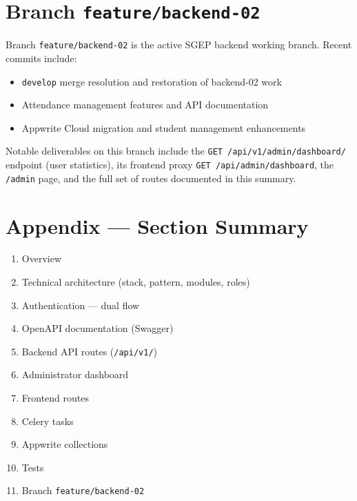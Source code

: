 \documentclass[11pt,a4paper]{article}
\begin{document}
\section{Branch \texttt{feature/backend-02}}

Branch \texttt{feature/backend-02} is the active SGEP backend working branch. Recent commits include:

\begin{itemize}[noitemsep]
    \item \texttt{develop} merge resolution and restoration of backend-02 work
    \item Attendance management features and API documentation
    \item Appwrite Cloud migration and student management enhancements
\end{itemize}

Notable deliverables on this branch include the \texttt{GET /api/v1/admin/dashboard/} endpoint (user statistics), its frontend proxy \texttt{GET /api/admin/dashboard}, the \texttt{/admin} page, and the full set of routes documented in this summary.

\section{Appendix --- Section Summary}

\begin{enumerate}
    \item Overview
    \item Technical architecture (stack, pattern, modules, roles)
    \item Authentication --- dual flow
    \item OpenAPI documentation (Swagger)
    \item Backend API routes (\texttt{/api/v1/})
    \item Administrator dashboard
    \item Frontend routes
    \item Celery tasks
    \item Appwrite collections
    \item Tests
    \item Branch \texttt{feature/backend-02}
\end{enumerate}
\end{document}
